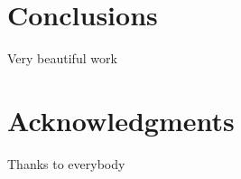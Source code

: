 \documentclass{sig-alternate}
\begin{document}
%



\section{Conclusions}
Very beautiful work


\section{Acknowledgments}
Thanks to everybody

%


%

\end{document}
